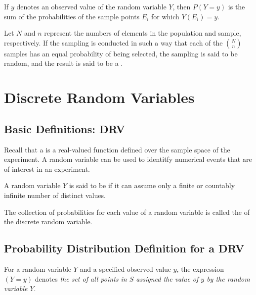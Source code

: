 \documentclass[12pt, a4paper, twoside, openright, titlepage]{book}
\begin{document}
\begin{rmk}{}{}
    If $y$ denotes an observed value of the random variable $Y$, then $P(Y=y)$ is the sum of the probabilities of the sample points $E_i$ for which $Y(E_i) = y$.
\end{rmk}

\begin{defn}{}{}
    Let $N$ and $n$ represent the numbers of elements in the population and sample, respectively. If the sampling is conducted in such a way that each of the $\binom{N}{n}$ samples has an equal probability of being selected, the sampling is said to be random, and the result is said to be a .
\end{defn}


\chapter{Discrete Random Variables}


\section{\textsection Basic Definitions: DRV}

\begin{rec}{}{}
    Recall that a  is a real-valued function defined over the sample space of the experiment. A random variable can be used to identitfy numerical events that are of interest in an experiment. 
\end{rec}


\begin{defn}{}{}
    A random variable $Y$ is said to be  if it can assume only a finite or countably infinite number of distinct values.
\end{defn}


\begin{rmk}{}{}
    The collection of probabilities for each value of a random variable is called the  of the discrete random variable.
\end{rmk}

\section{\textsection Probability Distribution Definition for a DRV}

\begin{nota*}{}{}
    For a random variable $Y$ and a specified observed value $y$, the expression $(Y=y)$ denotes \emph{the set of all points in $S$ assigned the value of $y$ by the random variable $Y$}.
\end{nota*}
\end{document}
